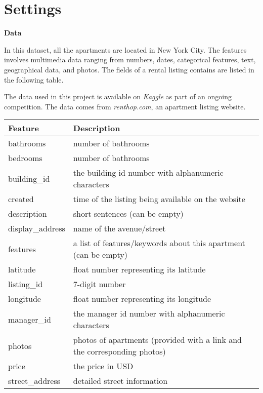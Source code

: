 \documentclass{article}
\begin{document}
\section{Settings} 

\noindent\textbf{\large Data} 

In this dataset, all the apartments are located in New York City. The features involves multimedia data ranging from numbers, dates, categorical features, text, geographical data, and photos.
The fields of a rental listing contains are listed in the following table. 

The data used in this project is available on \textit{Kaggle} as part of an ongoing competition. The data comes from \textit{renthop.com}, an apartment listing website.

\begin{center}
\begin{tabular}{ll}
\hline
Feature & Description \\
\hline
bathrooms & number of bathrooms \\
bedrooms & number of bathrooms \\
building\_id & the building id number with alphanumeric characters \\
created & time of the listing being available on the website \\
description & short sentences (can be empty)\\
display\_address & name of the avenue/street\\
features & a list of features/keywords about this apartment (can be empty)\\
latitude & float number representing its latitude\\
listing\_id & 7-digit number\\
longitude & float number representing its longitude\\
manager\_id & the manager id number with alphanumeric characters \\
photos & photos of apartments (provided with a link and the corresponding photos) \\
price & the price in USD \\
street\_address & detailed street information \\
\hline
\end{tabular}
\end{center}
\vspace{2.0em}
\end{document}

